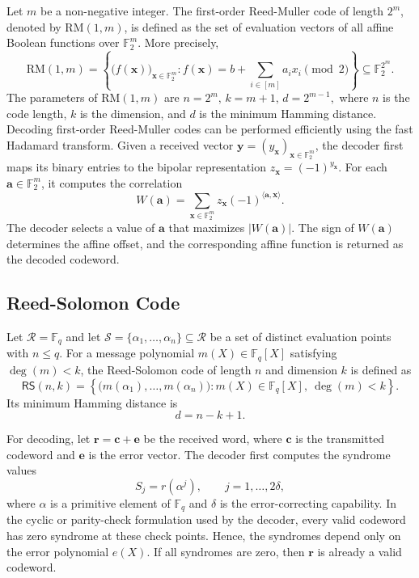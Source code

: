 \documentclass[12pt,a4paper]{report}
\begin{document}
Let $m$ be a non-negative integer. The first-order Reed-Muller code of length $2^m$, denoted by $\mathrm{RM}(1,m)$, is defined as the set of evaluation vectors of all affine Boolean functions over $\mathbb{F}_2^m$. More precisely,
\[
    \mathrm{RM}(1,m)
    =
    \left\{
    \bigl(f(\mathbf{x})\bigr)_{\mathbf{x}\in\mathbb{F}_2^m}
    :
    f(\mathbf{x})=b+\sum_{i\in[m]}a_i x_i \pmod 2
    \right\}
    \subseteq \mathbb{F}_2^{2^m}.
\]
The parameters of $\mathrm{RM}(1,m)$ are $n=2^m,\, k=m+1,\, d=2^{m-1},$
where $n$ is the code length, $k$ is the dimension, and $d$ is the minimum Hamming distance. Decoding first-order Reed-Muller codes can be performed efficiently using the fast Hadamard transform. Given a received vector $\mathbf{y}=(y_{\mathbf{x}})_{\mathbf{x}\in\mathbb{F}_2^m}$, the decoder first
maps its binary entries to the bipolar representation $z_{\mathbf{x}}=(-1)^{y_{\mathbf{x}}}$. For each
$\mathbf{a}\in\mathbb{F}_2^m$, it computes the correlation
\[
    W(\mathbf{a})
    =
    \sum_{\mathbf{x}\in\mathbb{F}_2^m}
    z_{\mathbf{x}}(-1)^{\langle \mathbf{a},\mathbf{x}\rangle}.
\]
The decoder selects a value of $\mathbf{a}$ that maximizes $|W(\mathbf{a})|$. The sign of $W(\mathbf{a})$ determines the affine offset, and the corresponding affine function is returned as the decoded codeword.


 \subsection{Reed-Solomon Code}



Let $\mathcal{R}=\mathbb{F}_q$ and let $\mathcal{S}=\{\alpha_1,\ldots,\alpha_n\}\subseteq\mathcal{R}$ be a set of distinct evaluation points with $n\le q$. For a message polynomial $m(X)\in\mathbb{F}_q[X]$ satisfying $\deg(m)<k$, the Reed-Solomon code of
length $n$ and dimension $k$ is defined as
\[
    \mathsf{RS}(n,k)
    =
    \left\{
    \bigl(m(\alpha_1),\ldots,m(\alpha_n)\bigr)
    :
    m(X)\in\mathbb{F}_q[X],\ \deg(m)<k
    \right\}.
\]
Its minimum Hamming distance is
\[
    d=n-k+1.
\]

For decoding, let $\mathbf{r}=\mathbf{c}+\mathbf{e}$ be the received word, where $\mathbf{c}$ is the transmitted codeword and $\mathbf{e}$ is the error vector. The decoder first computes the syndrome values
\[
    S_j = r(\alpha^j), \qquad j=1,\ldots,2\delta,
\]
where $\alpha$ is a primitive element of $\mathbb{F}_q$ and $\delta$ is the error-correcting capability. In the cyclic or parity-check formulation used by the decoder, every valid codeword has zero syndrome at these check points. Hence, the syndromes depend only on the error polynomial $e(X)$. If all syndromes are zero, then $\mathbf{r}$ is already a valid codeword.
\end{document}
